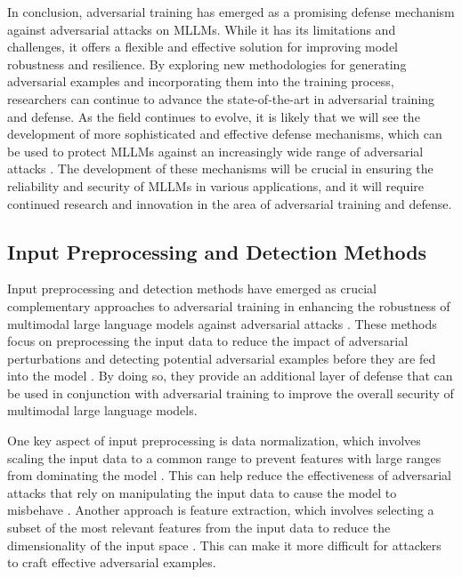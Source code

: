 \documentclass[11pt,a4paper]{article}
\begin{document}
In conclusion, adversarial training has emerged as a promising defense mechanism against adversarial attacks on MLLMs. While it has its limitations and challenges, it offers a flexible and effective solution for improving model robustness and resilience. By exploring new methodologies for generating adversarial examples and incorporating them into the training process, researchers can continue to advance the state-of-the-art in adversarial training and defense. As the field continues to evolve, it is likely that we will see the development of more sophisticated and effective defense mechanisms, which can be used to protect MLLMs against an increasingly wide range of adversarial attacks \cite{arxiv:2412.02104}. The development of these mechanisms will be crucial in ensuring the reliability and security of MLLMs in various applications, and it will require continued research and innovation in the area of adversarial training and defense.


\subsection{Input Preprocessing and Detection Methods}


Input preprocessing and detection methods have emerged as crucial complementary approaches to adversarial training in enhancing the robustness of multimodal large language models against adversarial attacks \cite{arxiv:2306.09093}. These methods focus on preprocessing the input data to reduce the impact of adversarial perturbations and detecting potential adversarial examples before they are fed into the model \cite{arxiv:2305.16103}. By doing so, they provide an additional layer of defense that can be used in conjunction with adversarial training to improve the overall security of multimodal large language models.

One key aspect of input preprocessing is data normalization, which involves scaling the input data to a common range to prevent features with large ranges from dominating the model \cite{arxiv:2401.13601}. This can help reduce the effectiveness of adversarial attacks that rely on manipulating the input data to cause the model to misbehave \cite{arxiv:2408.15998}. Another approach is feature extraction, which involves selecting a subset of the most relevant features from the input data to reduce the dimensionality of the input space \cite{arxiv:2506.16691}. This can make it more difficult for attackers to craft effective adversarial examples.
\end{document}
